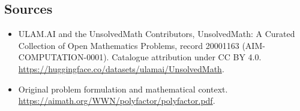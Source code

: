 \documentclass[11pt]{article}
\begin{document}
\subsection{Sources}
\begin{itemize}
\item[\hypertarget{source:20001163:1}{S1}] ULAM.AI and the UnsolvedMath Contributors, UnsolvedMath: A Curated Collection of Open Mathematics Problems, record 20001163 (AIM-COMPUTATION-0001). Catalogue attribution under CC BY 4.0.
\url{https://huggingface.co/datasets/ulamai/UnsolvedMath}.
\item[\hypertarget{source:20001163:2}{S2}] Original problem formulation and mathematical context.
\url{https://aimath.org/WWN/polyfactor/polyfactor.pdf}.
\end{itemize}
\label{end:20001163}
\end{document}

